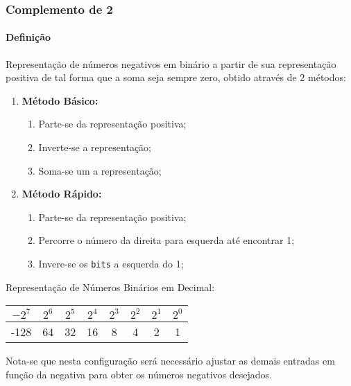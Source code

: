 \documentclass{article}
\begin{document}
        \subsubsection{Complemento de 2}
            \paragraph{Definição}Representação de números negativos em binário a partir de sua representação positiva de tal forma que a soma seja sempre zero, obtido através de 2 métodos:
                \begin{enumerate}[rightmargin = \leftmargin]
                    \item \textbf{Método Básico:}
                        \begin{enumerate}[noitemsep]
                            \item Parte-se da representação positiva;
                            \item Inverte-se a representação;
                            \item Soma-se um a representação;
                        \end{enumerate}

                    \item \textbf{Método Rápido:}
                        \begin{enumerate}[noitemsep]
                            \item Parte-se da representação positiva;
                            \item Percorre o número da direita para esquerda até encontrar 1;
                            \item Invere-se os \texttt{bits} a esquerda do 1;
                        \end{enumerate}
                \end{enumerate}
                \begin{example}
                    Representação de Números Binários em Decimal:
                        \begin{table}[H]
                            \centering  
                            \begin{tabular}[]{cc cc cc cc}
                                $-2^7$ & $2^6$ & $2^5$ & $2^4$ & $2^3$ & $2^2$ & $2^1$ & $2^0$\\\hline
                                -128   & 64    & 32    & 16    & 8     & 4     & 2     & 1\\
                            \end{tabular}
                        \end{table}
                \end{example}
            Nota-se que nesta configuração será necessário ajustar as demais entradas em função da negativa para obter os números negativos desejados.
\end{document}
